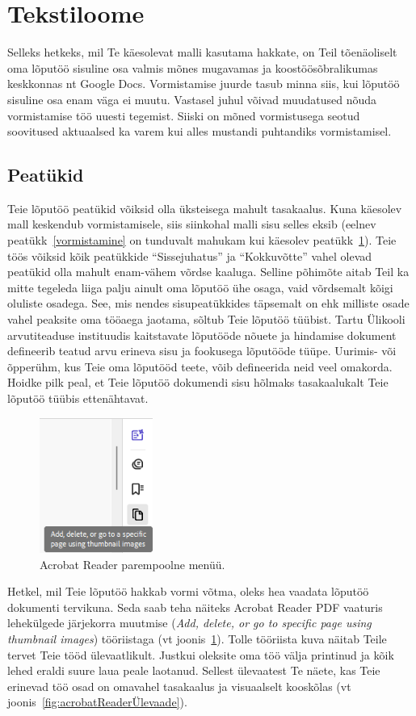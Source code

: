 \section{Tekstiloome} \label{tekstiloome}
Selleks hetkeks, mil Te käesolevat malli kasutama hakkate, on Teil tõenäoliselt oma lõputöö sisuline osa valmis mõnes mugavamas ja koostöösõbralikumas keskkonnas nt Google Docs. Vormistamise juurde tasub minna siis, kui lõputöö sisuline osa enam väga ei muutu. Vastasel juhul võivad muudatused nõuda vormistamise töö uuesti tegemist. Siiski on mõned vormistusega seotud soovitused aktuaalsed ka varem kui alles mustandi puhtandiks vormistamisel.

\subsection{Peatükid}
Teie lõputöö peatükid võiksid olla üksteisega mahult tasakaalus. Kuna käesolev mall keskendub vormistamisele, siis siinkohal malli sisu selles eksib (eelnev peatükk~\ref{vormistamine} on tunduvalt mahukam kui käesolev peatükk~\ref{tekstiloome}). Teie töös võiksid kõik peatükkide “Sissejuhatus” ja “Kokkuvõtte” vahel olevad peatükid olla mahult enam-vähem võrdse kaaluga. Selline põhimõte aitab Teil ka mitte tegeleda liiga palju ainult oma lõputöö ühe osaga, vaid võrdsemalt kõigi oluliste osadega. See, mis nendes sisupeatükkides täpsemalt on ehk milliste osade vahel peaksite oma tööaega jaotama, sõltub Teie lõputöö tüübist. Tartu Ülikooli arvutiteaduse instituudis kaitstavate lõputööde nõuete ja hindamise dokument defineerib teatud arvu erineva sisu ja fookusega lõputööde tüüpe. Uurimis- või õpperühm, kus Teie oma lõputööd teete, võib defineerida neid veel omakorda. Hoidke pilk peal, et Teie lõputöö dokumendi sisu hõlmaks tasakaalukalt Teie lõputöö tüübis ettenähtavat.

\begin{figure}
    \centering
    \includegraphics[width=0.33\textwidth]{figures/Joonis5-AcrobatReaderMenüü.png}
    \caption{Acrobat Reader parempoolne menüü.}
    \label{fig:acrobatReaderMenüü}
\end{figure}
Hetkel, mil Teie lõputöö hakkab vormi võtma, oleks hea vaadata lõputöö dokumenti tervikuna. Seda saab teha näiteks Acrobat Reader PDF vaaturis lehekülgede järjekorra muutmise (\emph{Add, delete, or go to specific page using thumbnail images}) tööriistaga (vt joonis~\ref{fig:acrobatReaderMenüü}). Tolle tööriista kuva näitab Teile tervet Teie tööd ülevaatlikult. Justkui oleksite oma töö välja printinud ja kõik lehed eraldi suure laua peale laotanud. Sellest ülevaatest Te näete, kas Teie erinevad töö osad on omavahel tasakaalus ja visuaalselt kooskõlas (vt joonis~\ref{fig:acrobatReaderÜlevaade}).


